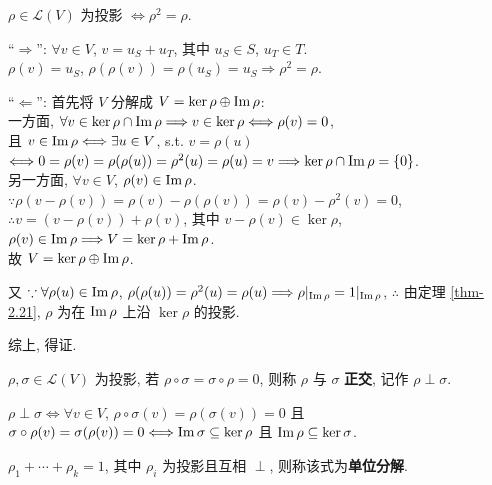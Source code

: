 \documentclass{note}
\begin{document}
\begin{thm}[(课本定理第 3 版 2.22)]
    $\rho\in\mathcal{L}(V)$ 为投影 $\Longleftrightarrow\rho^2=\rho$.
\end{thm}
\begin{pf}
    ``$\Longrightarrow$'': $\forall v\in V$, $v=u_S+u_T$, 其中 $u_S\in S$, $u_T\in T$.\\
    $\rho(v)=u_S$, $\rho(\rho(v))=\rho(u_S)=u_S\Longrightarrow\rho^2=\rho$.

    ``$\Longleftarrow$'': 首先将 $V$ 分解成 $V=\ker\rho\oplus\operatorname{Im}\rho$:\\
    一方面, $\forall v\in\ker\rho\cap\operatorname{Im}\rho\Longrightarrow v\in\ker\rho\Longleftrightarrow\rho(v)=0$,\\
    且 $v\in\operatorname{Im}\rho\Longleftrightarrow\exists u\in V$, s.t. $v=\rho(u)$\\
    $\Longleftrightarrow 0=\rho(v)=\rho(\rho(u))=\rho^2(u)=\rho(u)=v\Longrightarrow\ker\rho\cap\operatorname{Im}\rho=\{0\}$.\\
    另一方面, $\forall v\in V$, $\rho(v)\in\operatorname{Im}\rho$.\\
    $\because\rho(v-\rho(v))=\rho(v)-\rho(\rho(v))=\rho(v)-\rho^2(v)=0$, $\therefore v=(v-\rho(v))+\rho(v)$, 其中 $v-\rho(v)\in\ker\rho$, $\rho(v)\in\operatorname{Im}\rho\Longrightarrow V=\ker\rho+\operatorname{Im}\rho$.\\
    故 $V=\ker\rho\oplus\operatorname{Im}\rho$.

    又 $\because\forall\rho(u)\in\operatorname{Im}\rho$, $\rho(\rho(u))=\rho^2(u)=\rho(u)\Longrightarrow\rho|_{\operatorname{Im}\rho}=1|_{\operatorname{Im}\rho}$, $\therefore$ 由定理 \ref{thm-2.21}, $\rho$ 为在 $\operatorname{Im}\rho$ 上沿 $\ker\rho$ 的投影.

    综上, 得证.
\end{pf}

\begin{df}[正交]
    $\rho,\sigma\in\mathcal{L}(V)$ 为投影, 若 $\rho\circ\sigma=\sigma\circ\rho=0$, 则称 $\rho$ 与 $\sigma$ \textbf{正交}, 记作 $\rho\perp\sigma$.
\end{df}

$\rho\perp\sigma\Longleftrightarrow\forall v\in V$, $\rho\circ\sigma(v)=\rho(\sigma(v))=0$ 且 $\sigma\circ\rho(v)=\sigma(\rho(v))=0\Longleftrightarrow\operatorname{Im}\sigma\subseteq\ker\rho$ 且 $\operatorname{Im}\rho\subseteq\ker\sigma$.

\begin{df}[单位分解]
    $\rho_1+\cdots+\rho_k=1$, 其中 $\rho_i$ 为投影且互相 $\perp$, 则称该式为\textbf{单位分解}.
\end{df}
\end{document}

